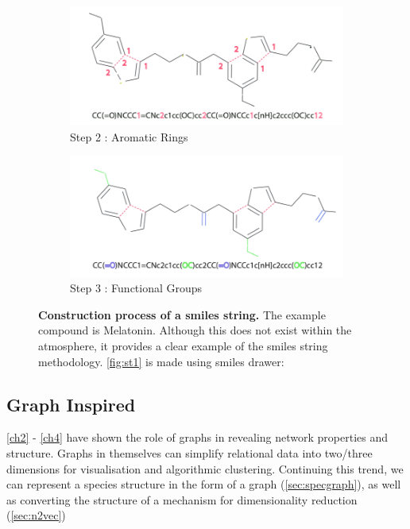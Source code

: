 \begin{figure}[H]
     \begin{subfigure}[b]{0.495\textwidth}
         \centering
         \includegraphics[width=\textwidth]{4fig/sm3.png}
         \caption{Step 2 : Aromatic Rings}
         \label{fig:st3}
     \end{subfigure}
     \hfill
     \begin{subfigure}[b]{0.495\textwidth}
        \centering
            \includegraphics[width=\textwidth]{4fig/sm2.png}
            \caption{Step 3 : Functional Groups }
            \label{fig:st4}
        \end{subfigure}

        \caption{ \textbf{Construction process of a smiles string.} The example compound is Melatonin. Although this does not exist within the atmosphere, it provides a clear example of the smiles string methodology. \autoref{fig:st1} is made using smiles drawer: \citep{smilesdrawer} }
        \label{fig:smiles}
\end{figure}


\subsection{Graph Inspired}

\autoref{ch2} - \ref{ch4} have shown the role of graphs in revealing network properties and structure. Graphs in themselves can simplify relational data into two/three dimensions for visualisation and algorithmic clustering. Continuing this trend, we can represent a species structure in the form of a graph (\autoref{sec:specgraph}), as well as converting the structure of a mechanism for dimensionality reduction (\autoref{sec:n2vec})


